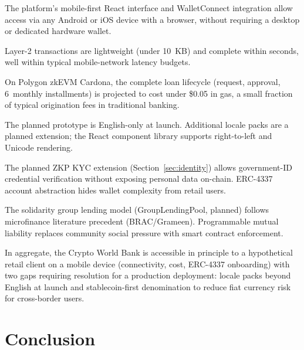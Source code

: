 \documentclass[12pt,a4paper]{report}
\begin{document}
\begin{description}[leftmargin=0pt]

\item[\textbf{1. Device access.}] The platform's mobile-first React interface and WalletConnect integration allow access via any Android or iOS device with a browser, without requiring a desktop or dedicated hardware wallet.

\item[\textbf{2. Connectivity.}] Layer-2 transactions are lightweight (under 10~KB) and complete within seconds, well within typical mobile-network latency budgets.

\item[\textbf{3. Transaction cost.}] On Polygon zkEVM Cardona, the complete loan lifecycle (request, approval, 6~monthly installments) is projected to cost under \$0.05 in gas, a small fraction of typical origination fees in traditional banking.

\item[\textbf{4. Language and literacy.}] The planned prototype is English-only at launch. Additional locale packs are a planned extension; the React component library supports right-to-left and Unicode rendering.

\item[\textbf{5. Identity and onboarding.}] The planned ZKP KYC extension (Section~\ref{sec:identity}) allows government-ID credential verification without exposing personal data on-chain. ERC-4337 account abstraction hides wallet complexity from retail users.

\item[\textbf{6. Group lending fit.}] The solidarity group lending model (GroupLendingPool, planned) follows microfinance literature precedent (BRAC/Grameen). Programmable mutual liability replaces community social pressure with smart contract enforcement.

\end{description}

In aggregate, the Crypto World Bank is accessible in principle to a hypothetical retail client on a mobile device (connectivity, cost, ERC-4337 onboarding) with two gaps requiring resolution for a production deployment: locale packs beyond English at launch and stablecoin-first denomination to reduce fiat currency risk for cross-border users.


\chapter{Conclusion}
\end{document}

